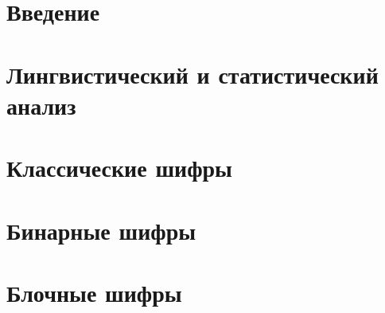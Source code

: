 \documentclass[unicode,12pt,a4paper,oneside,fleqn]{article}
\begin{document}
    
    \tableofcontents
    \pagebreak

    
    \section{Введение}
    
    \pagebreak
    
    \section{Лингвистический и статистический анализ}
    
    
    
    \pagebreak

    \section{Классические шифры}
    
    
    
    
    
    \pagebreak

    \section{Бинарные шифры}
    
    
    \pagebreak

    \section{Блочные шифры}
    
    \pagebreak

    
    
\end{document}
